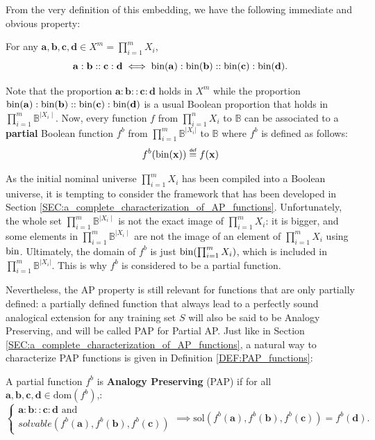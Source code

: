 From the very definition of this embedding, we have the following immediate and
obvious property:
\begin{property}
  \label{PROPER:analogy_nominal_iff_analogy_bin}
  For any $\mathbf{a}, \mathbf{b}, \mathbf{c}, \mathbf{d} \in X^m =
  \prod_{i=1}^m X_i$,
$$\mathbf{a}: \mathbf{b}:: \mathbf{c}: \mathbf{d} \iff
 \text{bin}(\mathbf{a}): \text{bin}(\mathbf{b}):: \text{bin}(\mathbf{c}):
  \text{bin}(\mathbf{d}).$$
 \end{property}
 \noindent
 Note that the proportion $\mathbf{a}: \mathbf{b}:: \mathbf{c}: \mathbf{d}$
 holds in $X^m$ while the proportion $\text{bin}(\mathbf{a}): \text{bin}(\mathbf{b})::
 \text{bin}(\mathbf{c}): \text{bin}(\mathbf{d})$ is a usual Boolean proportion that holds
 in $\prod_{i=1}^m\mathbb{B}^{\mid X_i \mid}$.  Now, every function $f$ from
 $\prod_{i=1}^n X_i$ to $\mathbb{B}$ can be associated to a \textbf{partial}
 Boolean function $f^b$ from $\prod_{i=1}^m \mathbb{B}^{|X_i|}$ to $\mathbb{B}$
 where $f^b$ is defined as follows:
$$
f^b(\bin(\mathbf{x})) \eqdef f(\mathbf{x})
$$

As the initial nominal universe  $\prod_{i=1}^m X_i$  has been compiled into a
Boolean universe, it is tempting to consider the framework that has been
developed in Section \ref{SEC:a_complete_characterization_of_AP_functions}.
Unfortunately, the whole set $\prod_{i=1}^m \mathbb{B}^{\mid X_i\mid}$ is not
the exact image of $\prod_{i=1}^m X_i$: it is bigger, and some elements in
$\prod_{i=1}^m  \mathbb{B}^{\mid X_i\mid}$ are not the image of an element of
$\prod_{i=1}^m X_i$ using $\text{bin}$.  Ultimately, the domain of $f^b$ is just
$\text{bin}(\prod_{i=1}^m X_i)$, which is included in $\prod_{i=1}^m
\mathbb{B}^{|X_i|}$. This is why $f^b$ is considered to be a partial function.

Nevertheless, the AP property is still relevant for functions that are only
partially defined: a partially defined function that always lead to a perfectly
sound analogical extension for any training set $S$ will also be said to be
Analogy Preserving, and will be called PAP for Partial AP. Just like in Section
\ref{SEC:a_complete_characterization_of_AP_functions}, a natural way to
characterize PAP functions is given in Definition \ref{DEF:PAP_functions}:

\begin{definition}
  \label{DEF:PAP_functions}
  A partial function $f^b$ is {\bf Analogy Preserving} (PAP)
  if for all $\mathbf{a}, \mathbf{b}, \mathbf{c}, \mathbf{d} \in
  \text{dom}(f^b)$,:
  $$
  \begin{cases}
    \mathbf{a} :  \mathbf{b} ::  \mathbf{c} :  \mathbf{d} \text{ and }\\
    solvable(f^b(\mathbf{a}),f^b(\mathbf{b}),f^b(\mathbf{c}))
  \end{cases}
  \implies \text{sol}(f^b(\mathbf{a}),f^b(\mathbf{b}),f^b(\mathbf{c})) =
  f^b(\mathbf{d}).
  $$
\end{definition}

